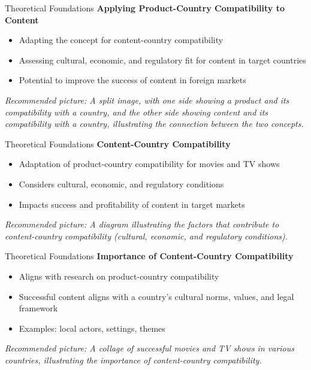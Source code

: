 \documentclass[
  ignorenonframetext,
]{beamer}
\begin{document}
\begin{frame}{Theoretical Foundations}
\protect\hypertarget{theoretical-foundations-5}{}
\textbf{Applying Product-Country Compatibility to Content}

\begin{itemize}
\item
  Adapting the concept for content-country compatibility
\item
  Assessing cultural, economic, and regulatory fit for content in target
  countries
\item
  Potential to improve the success of content in foreign markets
\end{itemize}

\emph{Recommended picture: A split image, with one side showing a
product and its compatibility with a country, and the other side showing
content and its compatibility with a country, illustrating the
connection between the two concepts.}
\end{frame}

\begin{frame}{Theoretical Foundations}
\protect\hypertarget{theoretical-foundations-6}{}
\textbf{Content-Country Compatibility}

\begin{itemize}
\item
  Adaptation of product-country compatibility for movies and TV shows
\item
  Considers cultural, economic, and regulatory conditions
\item
  Impacts success and profitability of content in target markets
\end{itemize}

\emph{Recommended picture: A diagram illustrating the factors that
contribute to content-country compatibility (cultural, economic, and
regulatory conditions).}
\end{frame}

\begin{frame}{Theoretical Foundations}
\protect\hypertarget{theoretical-foundations-7}{}
\textbf{Importance of Content-Country Compatibility}

\begin{itemize}
\item
  Aligns with research on product-country compatibility
\item
  Successful content aligns with a country's cultural norms, values, and
  legal framework
\item
  Examples: local actors, settings, themes
\end{itemize}

\emph{Recommended picture: A collage of successful movies and TV shows
in various countries, illustrating the importance of content-country
compatibility.}
\end{frame}
\end{document}
